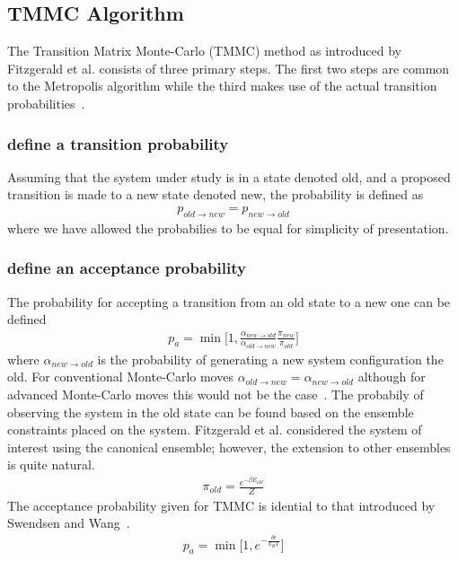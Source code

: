 \documentclass[letterpaper,twocolumn,amsmath,amssymb,pre,aps,10pt]{revtex4-1}
\begin{document}
\subsection{TMMC Algorithm}
The Transition Matrix Monte-Carlo (TMMC) method as introduced by
Fitzgerald et al. consists of three primary steps.  The first two steps
are common to the Metropolis algorithm while the third makes use of the
actual transition probabilities~\cite{fitzgerald2000monte}.

\subsubsection{define a transition probability}
Assuming that the system under study is in a state denoted old, and a
proposed transition is made to a new state denoted new, the probability
is defined as
\begin{align}
  p_{old \rightarrow new} = p_{new \rightarrow old}
\end{align}
where we have allowed the probabilies to be equal for simplicity of
presentation.

\subsubsection{define an acceptance probability}
The probability for accepting a transition from an old state to a new
one can be defined
\begin{align}
  p_{a} = \min\bigg[1,\frac{\alpha_{new\rightarrow old}}
  {\alpha_{old \rightarrow new}}\frac{\pi_{new}}{\pi_{old}}\bigg]
\end{align}
where $\alpha_{new\rightarrow old}$ is the probability of generating a
new system configuration the old.  For conventional Monte-Carlo moves
$\alpha_{old \rightarrow new} =\alpha_{new\rightarrow old}$ although
for advanced Monte-Carlo moves this would not be the
case~\cite{paluch2008comparing, siepmann1990method}.  The probabily of
observing the system in the old state can be found based on the
ensemble constraints placed on the system.  Fitzgerald et al.
considered the system of interest using the canonical ensemble;
however, the extension to other ensembles is quite natural.
\begin{align}
  \pi_{old} = \frac{e^{-\beta E_{old}}}{Z}
\end{align}
The acceptance probability given for TMMC is idential to that
introduced by Swendsen and Wang~\cite{wang2002transition}.
\begin{align}
  p_{a} = \min\bigg[1,e^{-\frac{\delta\epsilon}{k_{B} T}}\bigg]
\end{align}
\end{document}
